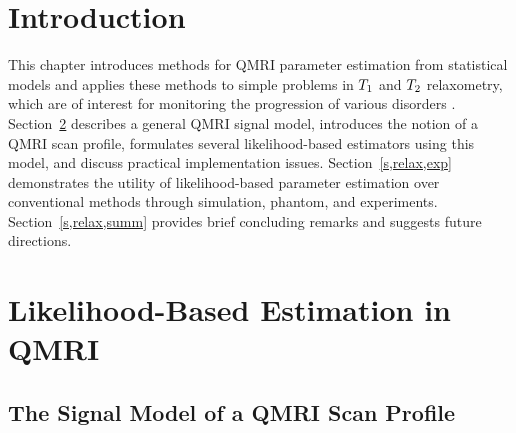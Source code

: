 
\section{Introduction}
\label{s,relax,intro}

This chapter introduces methods
for QMRI parameter estimation
from statistical models
and applies these methods
to simple problems 
in $T_1$ and $T_2$ relaxometry,
which are of interest
for monitoring the progression
of various disorders \cite{cheng:12:pma}.
Section~\ref{s,relax,meth}
describes a general QMRI signal model,
introduces the notion of a QMRI scan profile,
formulates several likelihood-based estimators
using this model,
and discuss practical implementation issues.
Section~\ref{s,relax,exp}
demonstrates the utility
of likelihood-based parameter estimation
over conventional methods
through simulation, phantom, and \invivo experiments.
Section~\ref{s,relax,summ}
provides brief concluding remarks
and suggests future directions.

\section{Likelihood-Based Estimation in QMRI}
\label{s,relax,meth}

\subsection{The Signal Model of a QMRI Scan Profile }
\label{ss,relax,meth,sig}

